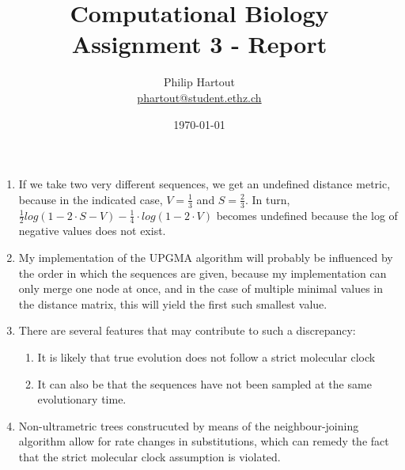 \documentclass[a4paper,10pt,twoside]{article}
\title{Computational Biology \\ Assignment 3 - Report}
\author{Philip Hartout \\ \url{phartout@student.ethz.ch}}
\date{\today}
\begin{document}
\maketitle

\begin{enumerate}
    \item If we take two very different sequences, we get an undefined distance metric, because in the indicated case, $V=\frac{1}{3}$ and $S=\frac{2}{3}$. In turn, $\frac{1}{2}log(1-2\cdot S-V)-\frac{1}{4}\cdot log(1-2\cdot V)$ becomes undefined because the log of negative values does not exist.
    \item My implementation of the UPGMA algorithm will probably be influenced by the order in which the sequences are given, because my implementation can only merge one node at once, and in the case of multiple minimal values in the distance matrix, this will yield the first such smallest value. 
    \item There are several features that may contribute to such a discrepancy:
    \begin{enumerate}
        \item It is likely that true evolution does not follow a strict molecular clock
        \item It can also be that the sequences have not been sampled at the same evolutionary time.
    \end{enumerate}
    \item Non-ultrametric trees construcuted by means of the neighbour-joining algorithm allow for rate changes in substitutions, which can remedy the fact that the strict molecular clock assumption is violated.  
\end{enumerate}
\end{document}
